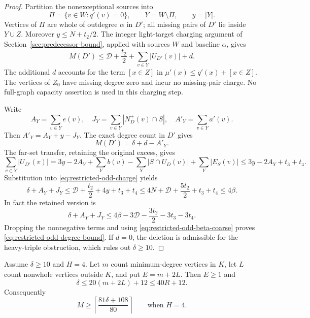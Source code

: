 \begin{proof}
Partition the nonexceptional sources into
\[
 \Pi=\{v\in W:q'(v)=0\},\qquad Y=W\setminus\Pi,
 \qquad y=|Y|.
\]
Vertices of $\Pi$ are whole of outdegree $\alpha$ in $D'$;
all missing pairs of $D'$ lie inside $Y\cup Z$.
Moreover $y\le N+t_2/2$.
The integer light-target charging argument of
Section~\ref{sec:predecessor-bound}, applied with sources $W$ and
baseline $\alpha$, gives
\begin{equation}\label{eq:restricted-odd-charge}
 M(D')\le\mathcal D+\frac{t_2}{2}
                   +\sum_{v\in Y}|U_{D'}(v)|+d.
\end{equation}
The additional $d$ accounts for the term $[x\in Z]$ in
$\mu'(x)\le q'(x)+[x\in Z]$.
The vertices of $Z_0$ have missing degree zero and incur no
missing-pair charge.
No full-graph capacity assertion is used in this charging step.

Write
\[
 A_Y=\sum_{v\in Y}e(v),\quad
 J_Y=\sum_{v\in Y}|N_D^+(v)\cap S|,\quad
 A'_Y=\sum_{v\in Y}a'(v).
\]
Then $A'_Y=A_Y+y-J_Y$.
The exact degree count in $D'$ gives
\[
 M(D')=\delta+d-A'_Y.
\]
The far-set transfer, retaining the original excess, gives
\[
 \sum_{v\in Y}|U_{D'}(v)|
 =3y-2A_Y+\sum_Yb(v)-\sum_Y|S\cap U_D(v)|
                       +\sum_Y|E_S(v)|
 \le3y-2A_Y+t_3+t_4.
\]
Substitution into \eqref{eq:restricted-odd-charge} yields
\[
 \delta+A_Y+J_Y
 \le\mathcal D+\frac{t_2}{2}+4y+t_3+t_4
 \le4N+\mathcal D+\frac{5t_2}{2}+t_3+t_4
 \le4\beta.
\]
In fact the retained version is
\[
 \delta+A_Y+J_Y
 \le4\beta-3\mathcal D-\frac{3t_2}{2}-3t_3-3t_4.
\]
Dropping the nonnegative terms and using
\eqref{eq:restricted-odd-beta-coarse} proves
\eqref{eq:restricted-odd-degree-bound}.
If $d=0$, the deletion is admissible for the heavy-triple
obstruction, which rules out $\delta\ge10$.
\end{proof}

\begin{theorem}
\label{thm:four-heavy-residual}
Assume $\delta\ge10$ and $H=4$.
Let $m$ count minimum-degree vertices in $K$, let $L$ count
nonwhole vertices outside $K$, and put $E=m+2L$.
Then $E\ge1$ and
\begin{equation}\label{eq:four-heavy-degree-residual}
 {\delta\le20(m+2L)+12\le40R+12.}
\end{equation}
Consequently
\[
 M\ge\left\lceil\frac{81\delta+108}{80}\right\rceil
 \qquad\text{when }H=4.
\]
\end{theorem}

